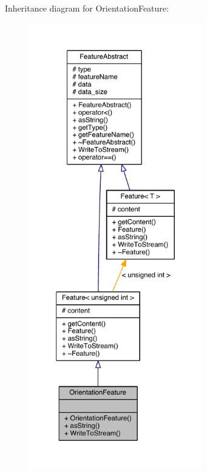 Inheritance diagram for Orientation\+Feature\+:\nopagebreak
\begin{figure}[H]
\begin{center}
\leavevmode
\includegraphics[height=550pt]{class_orientation_feature__inherit__graph}
\end{center}
\end{figure}


